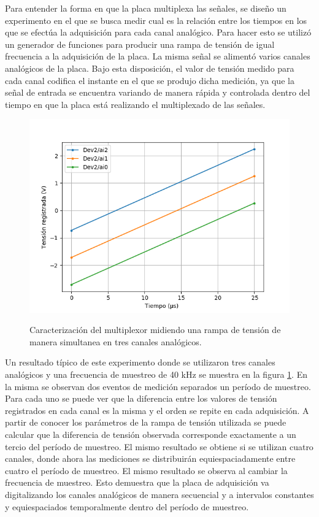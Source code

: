 \documentclass[a4paper,11pt]{article}
\begin{document}
Para entender la forma en que la placa multiplexa las señales, se diseño un experimento en el que se busca medir cual es la relación entre los tiempos en los que se efectúa la adquisición para cada canal analógico. Para hacer esto se utilizó un generador de funciones para producir una rampa de tensión de igual frecuencia a la adquisición de la placa. La misma señal se alimentó varios canales analógicos de la placa. Bajo esta disposición, el valor de tensión medido para cada canal codifica el instante en el que se produjo dicha medición, ya que la señal de entrada se encuentra variando de manera rápida y controlada dentro del tiempo en que la placa está realizando el multiplexado de las señales. 

\begin{figure}[h!]
\centering
\includegraphics[width=\columnwidth]{figs/multiplex.png}
\label{fig:multiplex}
\caption{Caracterización del multiplexor midiendo una rampa de tensión de manera simultanea en tres canales analógicos.}
\end{figure}


Un resultado típico de este experimento donde se utilizaron tres canales analógicos y una frecuencia de muestreo de 40 kHz se muestra en la figura \ref{fig:multiplex}. En la misma se observan dos eventos de medición separados un período de muestreo. Para cada uno se puede ver que la diferencia entre los valores de tensión registrados en cada canal es la misma y el orden se repite en cada adquisición. A partir de conocer los parámetros de la rampa de tensión utilizada se puede calcular que la diferencia de tensión observada corresponde exactamente a un tercio del período de muestreo. El mismo resultado se obtiene si se utilizan cuatro canales, donde ahora las mediciones se distribuirán equiespaciadamente entre cuatro el período de muestreo. El mismo resultado se observa al cambiar la frecuencia de muestreo. Esto demuestra que la placa de adquisición va digitalizando los canales analógicos de manera secuencial y a intervalos constantes y equiespaciados temporalmente dentro del período de muestreo.
\end{document}
